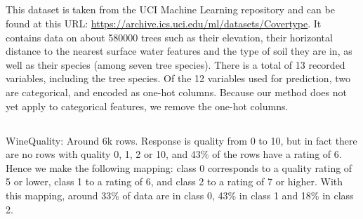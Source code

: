 \documentclass[../main.tex]{subfiles}
\begin{document}
\subsection{}

This dataset is taken from the UCI Machine Learning repository \cite{duaUCI2019} and can be found at this URL: \url{https://archive.ics.uci.edu/ml/datasets/Covertype}. 
It contains data on about 580000 trees such as their elevation, their horizontal distance to the nearest surface water features and the type of soil they are in, as well as their species (among seven tree species). There is a total of 13 recorded variables, including the tree species. Of the 12 variables used for prediction, two are categorical, and encoded as one-hot columns.
Because our method does not yet apply to categorical features, we remove the one-hot columns.

\subsection{}

WineQuality: Around 6k rows. Response is quality from 0 to 10, but in fact there are no rows with quality 0, 1, 2 or 10, and 43\% of the rows have a rating of 6.
Hence we make the following mapping: class 0 corresponds to a quality rating of 5 or lower, class 1 to a rating of 6, and class 2 to a rating of 7 or higher.
With this mapping, around 33\% of data are in class 0, 43\% in class 1 and 18\% in class 2.
\end{document}

